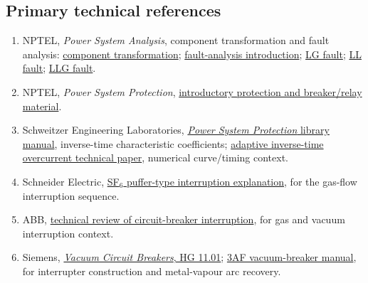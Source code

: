 \documentclass[11pt,a4paper]{article}
\begin{document}
\subsection{Primary technical references}
\begin{enumerate}
\item NPTEL, \emph{Power System Analysis}, component transformation and fault analysis: \href{https://archive.nptel.ac.in/content/storage2/courses/108104051/chapter_7/7_3.html}{component transformation}; \href{https://archive.nptel.ac.in/content/storage2/courses/108104051/chapter_8/8_intro.html}{fault-analysis introduction}; \href{https://archive.nptel.ac.in/content/storage2/courses/108104051/chapter_8/8_2.html}{LG fault}; \href{https://archive.nptel.ac.in/content/storage2/courses/108104051/chapter_8/8_3.html}{LL fault}; \href{https://archive.nptel.ac.in/content/storage2/courses/108104051/chapter_8/8_4.html}{LLG fault}.
\item NPTEL, \emph{Power System Protection}, \href{https://archive.nptel.ac.in/content/storage2/courses/108101039/Module-1/Lec-1/Sec-1.1/1.1_8.html}{introductory protection and breaker/relay material}.
\item Schweitzer Engineering Laboratories, \href{https://cdn.selinc.com/assets/Literature/Miscellaneous/RTAC%20Library%20Extension%20Manuals/PowerSystemProtection.pdf?v=20181019-202244}{\emph{Power System Protection} library manual}, inverse-time characteristic coefficients; \href{https://cdn.selinc.com/assets/Literature/Publications/Technical%20Papers/6621_AdaptiveInverse_AG_20140307_Web.pdf?v=20150812-150529}{adaptive inverse-time overcurrent technical paper}, numerical curve/timing context.
\item Schneider Electric, \href{https://www.se.com/ae/en/faqs/FA365127/}{SF$_6$ puffer-type interruption explanation}, for the gas-flow interruption sequence.
\item ABB, \href{https://library.e.abb.com/public/737de0b7f522f9b2c125728b00474780/75-78%201M720_ENG72dpi.pdf}{technical review of circuit-breaker interruption}, for gas and vacuum interruption context.
\item Siemens, \href{https://support.industry.siemens.com/cs/attachments/109745538/HG11.01_EN_20190603.pdf}{\emph{Vacuum Circuit Breakers}, HG 11.01}; \href{https://support.industry.siemens.com/cs/attachments/109986863/3AF_01_OVCB_40.5_kV_OVCB_Manual_.pdf}{3AF vacuum-breaker manual}, for interrupter construction and metal-vapour arc recovery.
\end{enumerate}
\end{document}
